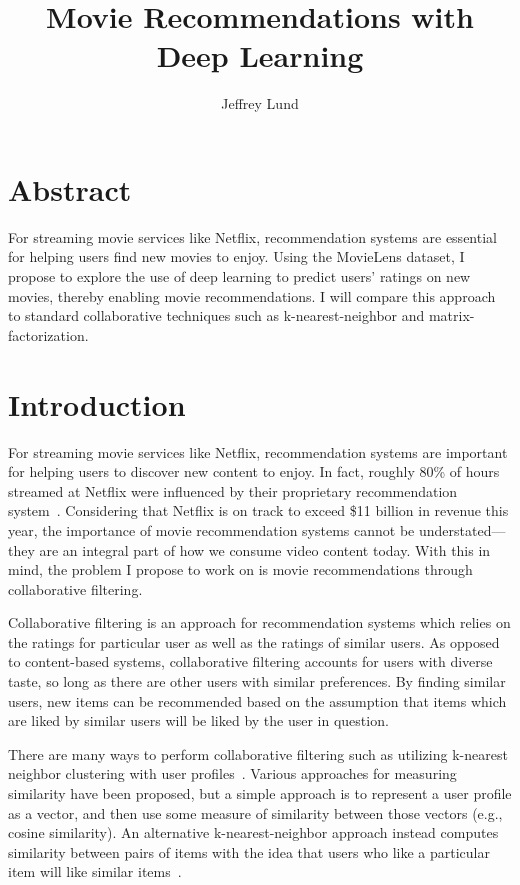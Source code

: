 \documentclass[12pt]{article}
\title{Movie Recommendations with Deep Learning}
\author{Jeffrey Lund}
\date{}
\begin{document}
\maketitle

\section*{Abstract}

For streaming movie services like Netflix, recommendation systems are
essential for helping users find new movies to enjoy. Using the MovieLens
dataset, I propose to explore the use of deep learning to predict users'
ratings on new movies, thereby enabling movie recommendations. I will compare
this approach to standard collaborative techniques such as k-nearest-neighbor
and matrix-factorization.

\section{Introduction}

For streaming movie services like Netflix, recommendation systems are
important for helping users to discover new content to enjoy.
In fact, roughly 80\% of hours streamed at Netflix were influenced by their
proprietary recommendation system~\cite{netflix}.
Considering that Netflix is on track to exceed \$11 billion in revenue this
year, the importance of movie recommendation systems cannot be understated---
they are an integral part of how we consume video content today.
With this in mind, the problem I propose to work on is movie recommendations
through collaborative filtering.

Collaborative filtering is an approach for recommendation systems which
relies on the ratings for particular user as well as the ratings
of similar users.
As opposed to content-based systems, collaborative filtering accounts for
users with diverse taste, so long as there are other users with similar
preferences.
By finding similar users, new items can be recommended based on the assumption
that items which are liked by similar users will be liked by the user in
question.

There are many ways to perform collaborative filtering such as utilizing
k-nearest neighbor clustering with user profiles~\cite{user-user}.
Various approaches for measuring similarity have been proposed, but a simple
approach is to represent a user profile as a vector, and then use some measure
of similarity between those vectors (e.g., cosine similarity).
An alternative k-nearest-neighbor approach instead computes similarity between
pairs of items with the idea that users who like a particular item will like
similar items~\cite{item-item}.
\end{document}
